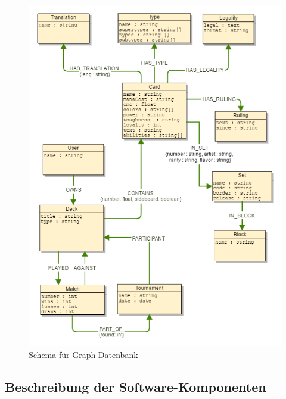 \begin{figure}[H]
    \myfloatalign
    \includegraphics[width=\textwidth]{gfx/graph.png}
    \caption{Schema für Graph-Datenbank}
    \label{fig:graph:schema}
\end{figure}

\subsection{Beschreibung der Software-Komponenten}

